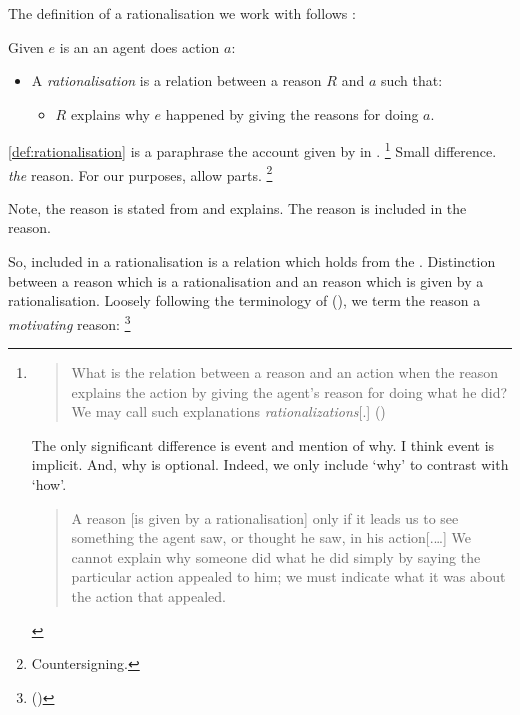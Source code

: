 \begin{note}
  The definition of a rationalisation we work with follows \citeauthor{Davidson:1963aa}:

  \begin{definition}[Rationalisations]%
    \label{def:rationalisation}
    Given \(e\) is an  an agent does action \(a\):
    \begin{itemize}
    \item
      A \emph{rationalisation} is a relation between a reason \(R\) and \(a\) such that:
      \begin{itemize}
      \item
        \(R\) explains why \(e\) happened by giving the \agents{} reasons for doing \(a\).
      \end{itemize}
    \end{itemize}
    \vspace{-\baselineskip}
  \end{definition}

  \noindent%
  \autoref{def:rationalisation} is a paraphrase the account given by \citeauthor{Davidson:1963aa} in .%
  \footnote{
    \begin{quote}
      What is the relation between a reason and an action when the reason explains the action by giving the agent's reason for doing what he did?
      We may call such explanations \emph{rationalizations}[.]%
      \mbox{}\hfill\mbox{(\citeyear[685]{Davidson:1963aa})}
    \end{quote}
    The only significant difference is event and mention of why.
    I think event is implicit.
    And, why is optional.
    Indeed, we only include `why' to contrast with `how'.

    \begin{quote}
      A reason [is given by a rationalisation] only if it leads us to see something the agent saw, or thought he saw, in his action[.\space\dots]
      We cannot explain why someone did what he did simply by saying the particular action appealed to him; we must indicate what it was about the action that appealed.
    \end{quote}
  }
  Small difference.
  \citeauthor{Davidson:1963aa} \emph{the} reason.
  For our purposes, allow parts.%
  \footnote{
    Countersigning.
  }

  Note, the reason is stated from  and explains.
  The \agents{} reason is included in the reason.

  So, included in a rationalisation is a relation which holds from the \agpe{}.
  Distinction between a reason which is a rationalisation and an \agents{} reason which is given by a rationalisation.
  Loosely following the terminology of \citeauthor{Smith:1994wo} (\citeyear{Smith:1994wo}), we term the \agents{} reason a \emph{motivating} reason:%
    \footnote{
    (\citeyear[96]{Smith:1994wo})

}
\end{note}
